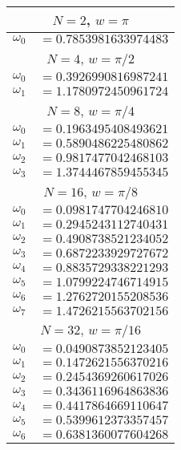 \begin{table}[p]
  \centering\small%
\begin{minipage}[t]{3in}
\null%
\begin{tabular}{l@{}l} \toprule
\multicolumn{2}{c}{$N=2$, $w=\pi$ } \\ \midrule
$\omega_{0}$ & ${}=0.7853981633974483$ \\ \toprule
\multicolumn{2}{c}{$N=4$, $w=\pi / 2$ } \\ \midrule
$\omega_{0}$ & ${}=0.3926990816987241$ \\
$\omega_{1}$ & ${}=1.1780972450961724$ \\ \toprule
\multicolumn{2}{c}{$N=8$, $w=\pi / 4$ } \\ \midrule
$\omega_{0}$ & ${}=0.1963495408493621$ \\
$\omega_{1}$ & ${}=0.5890486225480862$ \\
$\omega_{2}$ & ${}=0.9817477042468103$ \\
$\omega_{3}$ & ${}=1.3744467859455345$ \\ \toprule
\multicolumn{2}{c}{$N=16$, $w=\pi / 8$ } \\ \midrule
$\omega_{0}$ & ${}=0.0981747704246810$ \\
$\omega_{1}$ & ${}=0.2945243112740431$ \\
$\omega_{2}$ & ${}=0.4908738521234052$ \\
$\omega_{3}$ & ${}=0.6872233929727672$ \\
$\omega_{4}$ & ${}=0.8835729338221293$ \\
$\omega_{5}$ & ${}=1.0799224746714915$ \\
$\omega_{6}$ & ${}=1.2762720155208536$ \\
$\omega_{7}$ & ${}=1.4726215563702156$ \\ \toprule
\multicolumn{2}{c}{$N=32$, $w=\pi / 16$ } \\ \midrule
$\omega_{0}$ & ${}=0.0490873852123405$ \\
$\omega_{1}$ & ${}=0.1472621556370216$ \\
$\omega_{2}$ & ${}=0.2454369260617026$ \\
$\omega_{3}$ & ${}=0.3436116964863836$ \\
$\omega_{4}$ & ${}=0.4417864669110647$ \\
$\omega_{5}$ & ${}=0.5399612373357457$ \\
$\omega_{6}$ & ${}=0.6381360077604268$ \\

\end{tabular}
\end{minipage}
\end{table}
